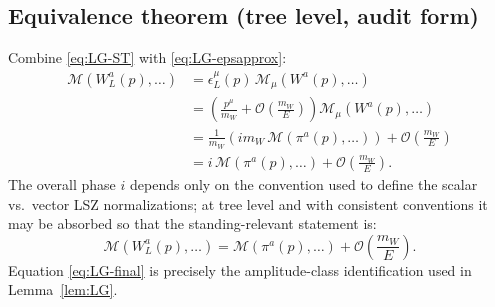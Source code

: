 \documentclass[11pt]{article}
\theoremstyle{remark}
\newcommand{\cO}{\mathcal{O}}
\begin{document}
\subsection{Equivalence theorem (tree level, audit form)}
Combine \eqref{eq:LG-ST} with \eqref{eq:LG-epsapprox}:
\begin{align}
\mathcal{M}(W_L^a(p),\dots)
&= \epsilon_{L}^{\mu}(p)\,\mathcal{M}_\mu(W^a(p),\dots)\nonumber\\
&=\left(\frac{p^\mu}{m_W}+\cO\!\left(\frac{m_W}{E}\right)\right)\mathcal{M}_\mu(W^a(p),\dots)\nonumber\\
&=\frac{1}{m_W}\left(i m_W\,\mathcal{M}(\pi^a(p),\dots)\right)+\cO\!\left(\frac{m_W}{E}\right)\nonumber\\
&= i\,\mathcal{M}(\pi^a(p),\dots)+\cO\!\left(\frac{m_W}{E}\right).
\end{align}
The overall phase $i$ depends only on the convention used to define the scalar vs.\ vector LSZ
normalizations; at tree level and with consistent conventions it may be absorbed so that the
standing-relevant statement is:
\begin{equation}\label{eq:LG-final}
\mathcal{M}(W_L^a(p),\dots)
=
\mathcal{M}(\pi^a(p),\dots)
+\cO\!\left(\frac{m_W}{E}\right).
\end{equation}
Equation \eqref{eq:LG-final} is precisely the amplitude-class identification used in Lemma~\ref{lem:LG}.
\end{document}
